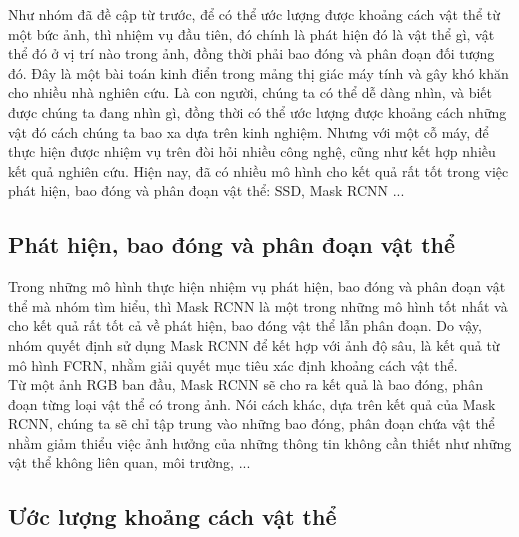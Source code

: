 Như nhóm đã đề cập từ trước, để có thể ước lượng được khoảng cách vật thể từ một bức ảnh, thì nhiệm vụ đầu tiên, đó chính là phát hiện đó là vật thể gì, vật thể đó ở vị trí nào trong ảnh, đồng thời phải bao đóng và phân đoạn đối tượng đó. Đây là một bài toán kinh điển trong mảng thị giác máy tính và gây khó khăn cho nhiều nhà nghiên cứu. Là con người, chúng ta có thể dễ dàng nhìn, và biết được chúng ta đang nhìn gì, đồng thời có thể ước lượng được khoảng cách những vật đó cách chúng ta bao xa dựa trên kinh nghiệm. Nhưng với một cỗ máy, để thực hiện được nhiệm vụ trên đòi hỏi nhiều công nghệ, cũng như kết hợp nhiều kết quả nghiên cứu. Hiện nay, đã có nhiều mô hình cho kết quả rất tốt trong việc phát hiện, bao đóng và phân đoạn vật thể: SSD, Mask RCNN ... 


\subsection{Phát hiện, bao đóng và phân đoạn vật thể}

Trong những mô hình thực hiện nhiệm vụ phát hiện, bao đóng và phân đoạn vật thể mà nhóm tìm hiểu, thì Mask RCNN \cite{He2017MaskR} là một trong những mô hình tốt nhất và cho kết quả rất tốt cả về phát hiện, bao đóng vật thể lẫn phân đoạn. Do vậy, nhóm quyết định sử dụng Mask RCNN  để kết hợp với ảnh độ sâu, là kết quả từ mô hình FCRN, nhằm giải quyết mục tiêu xác định khoảng cách vật thể.\\

Từ một ảnh RGB ban đầu, Mask RCNN sẽ cho ra kết quả là bao đóng, phân đoạn từng loại vật thể có trong ảnh. Nói cách khác, dựa trên kết quả của Mask RCNN, chúng ta sẽ chỉ tập trung vào những bao đóng, phân đoạn chứa vật thể nhằm giảm thiểu việc ảnh hưởng của những thông tin không cần thiết như những vật thể không liên quan, môi trường, ...

\subsection{Ước lượng khoảng cách vật thể}


